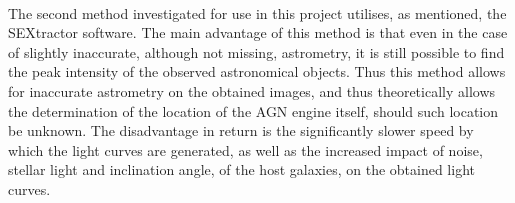 \documentclass[a4paper, 12pt, twoside]{article}
\begin{document}
\\
The second method investigated for use in this project utilises, as mentioned, the SEXtractor software. The main advantage of this method is that even in the case of slightly inaccurate, although not missing, astrometry, it is still possible to find the peak intensity of the observed astronomical objects. Thus this method allows for inaccurate astrometry on the obtained images, and thus theoretically allows the determination of the location of the AGN engine itself, should such location be unknown. The disadvantage in return is the significantly slower speed by which the light curves are generated, as well as the increased impact of noise, stellar light and inclination angle, of the host galaxies, on the obtained light curves. \\
\\
\end{document}
